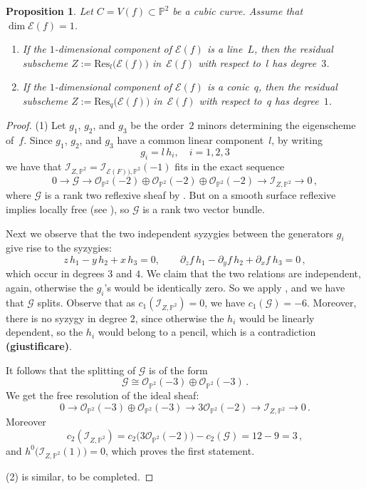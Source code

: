 \documentclass{amsart}
\theoremstyle{plain}
\newtheorem{prop}[lemma]{Proposition}
\theoremstyle{definition}
\newcommand{\p}{\mathbb{P}}
\newcommand{\oo}{\mathcal{O}}
\newcommand{\Eig}[1]{\mathcal{E}\!\left( {#1} \right)}
\begin{document}
\begin{prop}
\label{p2}
Let $C = V(f) \subset \p^2$ be a cubic curve.
Assume that $\dim \Eig{f} = 1$.
%
\begin{enumerate}
\item If the $1$-dimensional component of $\Eig{f}$ is a line~$L$,
then the residual subscheme $Z := \mathrm{Res}_l \bigl( \Eig{f} \bigr)$ in~$\Eig{f}$ with respect to~$l$ has degree~$3$.
\item If the $1$-dimensional component of $\Eig{f}$ is a conic~$q$,
then the residual subscheme $Z := \mathrm{Res}_q \bigl( \Eig{f} \bigr)$ in~$\Eig{f}$ with respect to~$q$ has degree~$1$.
\end{enumerate}
%
\end{prop}
\begin{proof}
(1)
Let $g_1$, $g_2$, and $g_3$ be the order~$2$ minors determining the eigenscheme of~$f$.
Since $g_1$, $g_2$, and $g_3$ have a common linear component~$l$, by writing
\[
 g_i = l \, h_i, \quad i=1,2,3
\]
we have that $\mathcal{I}_{Z, \p^2} = \mathcal{I}_{\Eig{F}), \p^2} (-1)$
fits in the exact sequence
\[
 0 \to \mathcal{G} \to \oo_{\p^2} (-2) \oplus \oo_{\p^2} (-2) \oplus \oo_{\p^2} (-2) \to \mathcal{I}_{Z,\p^2} \to 0 \,,
\]
where $\mathcal{G}$ is a rank two reflexive sheaf by \cite[Proposition 1]{Hartshorne1980}.
But on a smooth surface reflexive implies locally free (see \cite[Example~1.1.6]{Huybrechts2010}),
so $\mathcal{G}$ is a rank two vector bundle.

Next we observe that the two independent
syzygies between the generators $g_i$ give rise to the syzygies:
\[
z\, h_1 - y\, h_2 + x\, h_3 = 0, \qquad \partial_z f\, h_1 - \partial_y f \, h_2 + \partial_x f \ h_3=0 \,,
\]
which occur in degrees $3$ and $4$. We claim that the two relations are independent, again,
otherwise the $g_i$'s would be identically zero. So we apply \cite[Proposition~12]{Ellia2020}, and we have that $\mathcal {G}$ splits. Observe that as $c_1(\mathcal {I}_{Z,\p^2})=0$, we have $c_1(\mathcal {G})=-6$. Moreover, there is no syzygy in degree $2$, since
otherwise the $h_i$ would be linearly dependent, so the $h_i$ would belong to a pencil, which is a contradiction \textbf{(giustificare)}.

It follows that the splitting of $\mathcal{G}$ is of the form
%
\[
\mathcal{G} \cong \oo_{\p^2} (-3) \oplus \oo_{\p^2} (-3) \,.
\]
%
We get the free resolution of the ideal sheaf:
%
\[
0\to \oo_{\p^2} (-3)\oplus \oo_{\p^2} (-3) \to 3\oo_{\p^2} (-2)\to \mathcal {I}_{Z,\p^2} \to 0 \,.
\]
%
Moreover
%
\[
c_2 (\mathcal{I}_{Z,\p^2} ) = c_2 \bigl( 3\oo_{\p^2}(-2) \bigr) - c_2 (\mathcal{G}) = 12 - 9 = 3 \,,
\]
%
and $h^0 \bigl( \mathcal{I}_{Z,\p^2}(1) \bigr) = 0$, which proves the first statement.

\medskip
(2) is similar, to be completed.
\end{proof}
\end{document}
